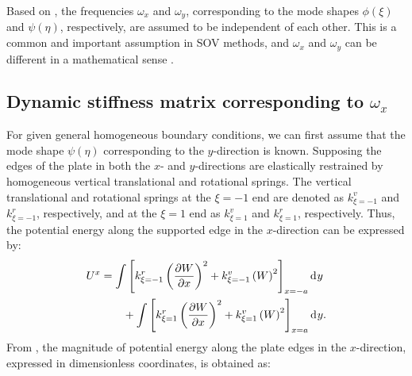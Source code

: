 \documentclass[preprint,12pt]{elsarticle}
\newcommand{\id}{\mathrm{d}\mkern1mu}
\begin{document}
Based on , the frequencies $\omega_x$ and $\omega_y$, corresponding to the mode shapes $\phi(\xi)$ and $\psi(\eta)$, respectively, are assumed to be independent of each other.
This is a common and important assumption in SOV methods, and $\omega_x$ and $\omega_y$ can be different in a mathematical sense \cite{xing2020extended}.


\subsection{Dynamic stiffness matrix corresponding to $\omega_x$}\label{sec:DSMx}
For given general homogeneous boundary conditions, we can first assume that the mode shape $\psi(\eta)$ corresponding to the $y$-direction is known. 
Supposing the edges of the plate in both the $x$- and $y$-directions are elastically restrained by homogeneous vertical translational and rotational springs.
The vertical translational and rotational springs at the $\xi = -1$ end are denoted as $k^v_{\xi = -1}$ and $k^r_{\xi = -1}$, respectively, and at the $\xi = 1$ end as $k^v_{\xi = 1}$ and $k^r_{\xi = 1}$, respectively. 
Thus, the potential energy along the supported edge in the $x$-direction can be expressed by:
%
\begin{equation}\label{eq:poten_energy_edgex}
	\begin{split}
		U^{x} &=  \int\left[k^r_{\xi=-1} \left( \frac{\partial W}{\partial x} \right)^2 + k^v_{\xi=-1} \left( W \right)^2\right]_{x=-a} \id y\\
		&\qquad +  \int\left[k^r_{\xi=1} \left( \frac{\partial W}{\partial x} \right)^2 + k^v_{\xi=1} \left( W \right)^2\right]_{x=a} \id y.
	\end{split}
\end{equation}
%
From , the magnitude of potential energy along the plate edges in the $x$-direction, expressed in dimensionless coordinates, is obtained as:
\end{document}
